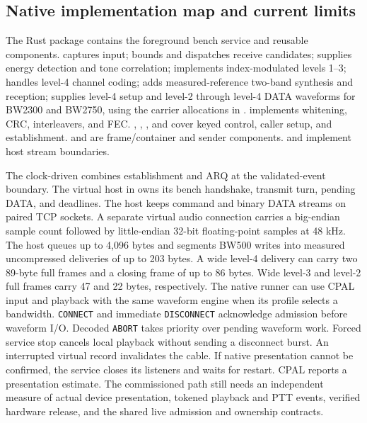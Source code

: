 \subsection{Native implementation map and current limits}
The Rust package contains the foreground bench service and reusable components.
 captures input;  bounds and dispatches
receive candidates;  supplies energy detection and tone
correlation;  implements index-modulated levels 1--3;
 handles level-4 channel coding;
 adds measured-reference two-band synthesis and
reception;  supplies level-4 setup and level-2 through
level-4 DATA waveforms for BW2300 and BW2750, using the carrier allocations
in .  implements whitening, CRC, interleavers, and
FEC. , , , and
 cover keyed control, caller setup, and
establishment.  and  are frame/container
and sender components.  and  implement
host stream boundaries.

The clock-driven  combines establishment and ARQ at
the validated-event boundary. The virtual host in 
owns its bench handshake, transmit turn, pending DATA, and deadlines.
The host keeps command and binary DATA streams on paired TCP sockets. A
separate virtual audio connection carries a big-endian sample count followed
by little-endian 32-bit floating-point samples at 48 kHz. The host queues
up to 4,096 bytes and segments BW500 writes into measured uncompressed
deliveries of up to 203 bytes. A wide level-4 delivery can carry two 89-byte
full frames and a closing frame of up to 86 bytes. Wide level-3 and level-2
full frames carry 47 and 22 bytes, respectively.
The native  runner can use CPAL input
and playback with the same waveform engine when its profile selects a
bandwidth. \texttt{CONNECT} and immediate \texttt{DISCONNECT} acknowledge
admission before waveform I/O. Decoded \texttt{ABORT} takes priority over
pending waveform work. Forced service stop cancels local playback without
sending a disconnect burst. An interrupted virtual record invalidates the
cable. If native presentation cannot be confirmed, the service closes its
listeners and waits for restart. CPAL reports a presentation estimate.
The commissioned path still needs an independent measure of actual device
presentation, tokened playback and PTT events, verified hardware release,
and the shared live admission and ownership contracts.

